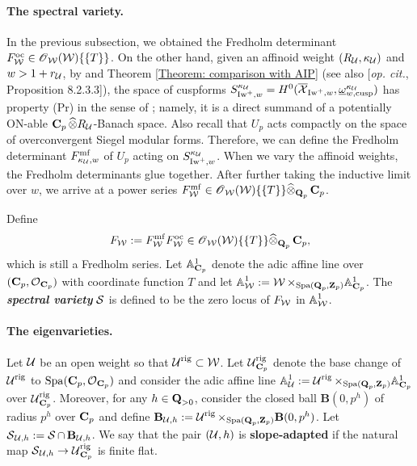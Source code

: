 \paragraph{The spectral variety.}
In the previous subsection, we obtained the Fredholm determinant $F_{\calW}^{\oc}\in \scrO_{\calW}(\calW)\{\{T\}\}$. On the other hand, given an affinoid weight $(R_{\calU}, \kappa_{\calU})$ and $w>1+r_{\calU}$, by \cite[Proposition 8.1.3.1]{AIP-2015} and Theorem \ref{Theorem: comparison with AIP} (see also [\textit{op. cit.}, Proposition 8.2.3.3]), the space of cuspforms $S_{\Iw^+,w}^{\kappa_{\calU}}=H^0(\overline{\calX}_{\Iw^+, w}, \underline{\omega}_{w, \cusp}^{\kappa_{\calU}})$ has property (Pr) in the sense of \cite{Buzzard_2007}; namely, it is a direct summand of a potentially ON-able $\C_p\widehat{\otimes}R_{\calU}$-Banach space. Also recall that $U_p$ acts compactly on the space of overconvergent Siegel modular forms. Therefore, we can define the Fredholm determinant $F_{\kappa_{\calU}, w}^{\mf}$ of $U_p$ acting on $S_{\Iw^+, w}^{\kappa_{\calU}}$. When we vary the affinoid weights, the Fredholm determinants glue together. After further taking the inductive limit over $w$, we arrive at a power series $F_{\calW}^{\mf}\in \scrO_{\calW}(\calW)\{\{T\}\}\widehat{\otimes}_{\Q_p}\C_p$.

Define $$F_{\calW}:=F_{\calW}^{\mf}F_{\calW}^{\oc}\in \scrO_{\calW}(\calW)\{\{T\}\}\widehat{\otimes}_{\Q_p}\C_p,$$ which is still a Fredholm series. Let $\mathbb{A}_{\C_p}^1$ denote the adic affine line over $(\C_p, \calO_{\C_p})$ with coordinate function $T$ and let $\bbA_{\calW}^1:=\calW\times_{\Spa(\Q_p, \Z_p)}\mathbb{A}_{\C_p}^1$. The \textit{\textbf{spectral variety}} $\calS$ is defined to be the zero locus of $F_{\calW}$ in $\bbA_{\calW}^1$.

\paragraph{The eigenvarieties.} 

\begin{Definition}\label{Defintiion: slope data}
Let $\calU$ be an open weight so that $\calU^{\rig}\subset\calW$. Let $\calU^{\rig}_{\C_p}$ denote the base change of $\calU^{\rig}$ to $\Spa(\C_p, \calO_{\C_p})$ and consider the adic affine line $\bbA_{\calU}^1:=\calU^{\rig}\times_{\Spa(\Q_p, \Z_p)}\mathbb{A}_{\C_p}^1$ over $\calU^{\rig}_{\C_p}$. Moreover, for any $h\in \Q_{> 0}$, consider the closed ball $\mathbf{B}(0,p^h)$ of radius $p^h$ over $\C_p$ and define $\B_{\calU, h}:= \calU^{\rig} \times_{\Spa(\Q_p, \Z_p)}\mathbf{B}(0, p^h)$. Let $\calS_{\calU, h}:=\calS\cap \B_{\calU, h}$. We say that the pair $(\calU, h)$ is \textbf{slope-adapted} if  the natural map $\calS_{\calU, h}\rightarrow \calU^{\rig}_{\C_p}$ is finite flat.
\end{Definition}


